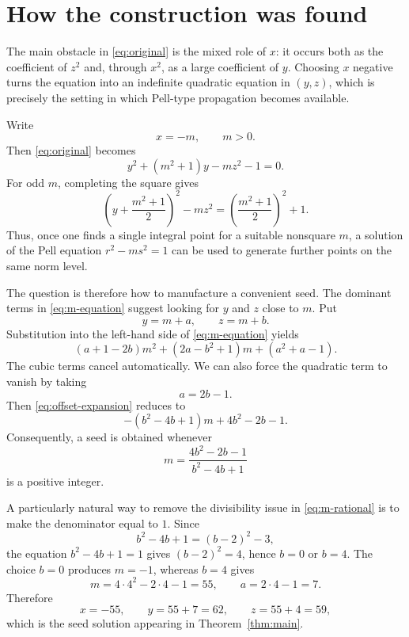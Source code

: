 \documentclass[11pt]{article}
\theoremstyle{remark}
\begin{document}
\section{How the construction was found}\label{sec:discovery}

The main obstacle in \eqref{eq:original} is the mixed role of $x$: it occurs both as the coefficient of $z^2$ and, through $x^2$, as a large coefficient of $y$.  Choosing $x$ negative turns the equation into an indefinite quadratic equation in $(y,z)$, which is precisely the setting in which Pell-type propagation becomes available.

Write
\[
 x=-m,
 \qquad m>0.
\]
Then \eqref{eq:original} becomes
\begin{equation}\label{eq:m-equation}
 y^2+(m^2+1)y-mz^2-1=0.
\end{equation}
For odd $m$, completing the square gives
\begin{equation}\label{eq:general-norm}
 \left(y+\frac{m^2+1}{2}\right)^2-mz^2
 =\left(\frac{m^2+1}{2}\right)^2+1.
\end{equation}
Thus, once one finds a single integral point for a suitable nonsquare $m$, a solution of the Pell equation $r^2-ms^2=1$ can be used to generate further points on the same norm level.

The question is therefore how to manufacture a convenient seed.  The dominant terms in \eqref{eq:m-equation} suggest looking for $y$ and $z$ close to $m$.  Put
\[
 y=m+a,
 \qquad
 z=m+b.
\]
Substitution into the left-hand side of \eqref{eq:m-equation} yields
\begin{equation}\label{eq:offset-expansion}
 (a+1-2b)m^2+(2a-b^2+1)m+(a^2+a-1).
\end{equation}
The cubic terms cancel automatically.  We can also force the quadratic term to vanish by taking
\[
 a=2b-1.
\]
Then \eqref{eq:offset-expansion} reduces to
\[
 -(b^2-4b+1)m+4b^2-2b-1.
\]
Consequently, a seed is obtained whenever
\begin{equation}\label{eq:m-rational}
 m=\frac{4b^2-2b-1}{b^2-4b+1}
\end{equation}
is a positive integer.

A particularly natural way to remove the divisibility issue in \eqref{eq:m-rational} is to make the denominator equal to $1$.  Since
\[
 b^2-4b+1=(b-2)^2-3,
\]
the equation $b^2-4b+1=1$ gives $(b-2)^2=4$, hence $b=0$ or $b=4$.  The choice $b=0$ produces $m=-1$, whereas $b=4$ gives
\[
 m=4\cdot4^2-2\cdot4-1=55,
 \qquad
 a=2\cdot4-1=7.
\]
Therefore
\[
 x=-55,
 \qquad
 y=55+7=62,
 \qquad
 z=55+4=59,
\]
which is the seed solution appearing in Theorem~\ref{thm:main}.
\end{document}
